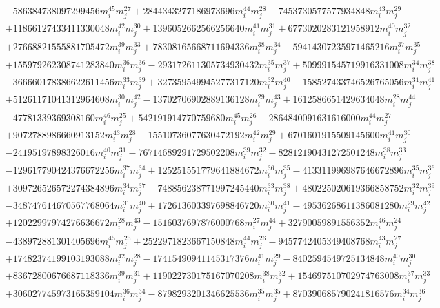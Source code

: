 {\begin{align*}
&-586384738097299456m_i^{45}m_j^{27}+2844343277186973696m_i^{44}m_j^{28}-7453730577577934848m_i^{43}m_j^{29}\\
&+11866127433411330048m_i^{42}m_j^{30}+1396052662566256640m_i^{41}m_j^{31}+6773020283121958912m_i^{40}m_j^{32}\\
&+27668821555881705472m_i^{39}m_j^{33}+78308165668711694336m_i^{38}m_j^{34}-59414307235971465216m_i^{37}m_j^{35}\\
&+155979262308741283840m_i^{36}m_j^{36}-293172611305734930432m_i^{35}m_j^{37}+509991545719916331008m_i^{34}m_j^{38}\\
&-366660178386622611456m_i^{33}m_j^{39}+327359549945277317120m_i^{32}m_j^{40}-158527433746526765056m_i^{31}m_j^{41}\\
&+51261171041312964608m_i^{30}m_j^{42}-13702706902889136128m_i^{29}m_j^{43}+1612586651429634048m_i^{28}m_j^{44}\\
&-47781339369308160m_i^{46}m_j^{25}+542191914770759680m_i^{45}m_j^{26}-2864840091631616000m_i^{44}m_j^{27}\\
&+9072788986660913152m_i^{43}m_j^{28}-15510736077630472192m_i^{42}m_j^{29}+6701601915509145600m_i^{41}m_j^{30}\\
&-24195197898326016m_i^{40}m_j^{31}-76714689291729502208m_i^{39}m_j^{32}-82812190431272501248m_i^{38}m_j^{33}\\
&-129617790424376672256m_i^{37}m_j^{34}+125251551779641884672m_i^{36}m_j^{35}-413311996987646672896m_i^{35}m_j^{36}\\
&+309726526572274384896m_i^{34}m_j^{37}-748856238771997245440m_i^{33}m_j^{38}+480225020619366858752m_i^{32}m_j^{39}\\
&-348747614670567768064m_i^{31}m_j^{40}+172613603397698846720m_i^{30}m_j^{41}-49536268611386081280m_i^{29}m_j^{42}\\
&+12022997974276636672m_i^{28}m_j^{43}-1516037697876000768m_i^{27}m_j^{44}+32790059891556352m_i^{46}m_j^{24}\\
&-438972881301405696m_i^{45}m_j^{25}+2522971823667150848m_i^{44}m_j^{26}-9457742405349408768m_i^{43}m_j^{27}\\
&+17482374199103193088m_i^{42}m_j^{28}-17415490941145317376m_i^{41}m_j^{29}-8402594549725134848m_i^{40}m_j^{30}\\
&+83672800676687118336m_i^{39}m_j^{31}+119022730175167070208m_i^{38}m_j^{32}+154697510702974763008m_i^{37}m_j^{33}\\
&+306027745973165359104m_i^{36}m_j^{34}-8798293201346625536m_i^{35}m_j^{35}+870390685790241816576m_i^{34}m_j^{36}\\

\end{align*}}
